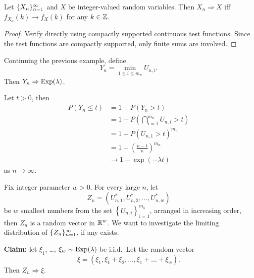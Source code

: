 \documentclass[a4paper]{article}
\newcommand{\convd}{\Rightarrow}
\begin{document}
\begin{prop}
  Let $\{ X_n \}_{n=1}^\infty$ and $X$ be integer-valued random variables.
  Then $X_n \convd X$ iff $f_{X_n} (k) \to f_X (k)$ for any $k \in \mathbb{Z}$.
\end{prop}

\begin{proof}
  Verify directly using compactly supported continuous test functions. 
  Since the test functions 
  are compactly supported, only finite sums are involved.

\end{proof}

\begin{eg}
  Continuing the previous example, define 
  \[
  Y_n = \min_{1 \leq i \leq m_n} U_{n, i}.
  \]
  Then $Y_n \convd \Exp (\lambda)$.

  Let $t > 0$, then 
  \begin{align*}
    P \left( Y_n \leq t \right)
    &= 1 - P \left( Y_n > t \right) \\
    &= 1 - P \left( \bigcap_{i=1}^{m_n} U_{n, i} > t \right) \\
    &= 1 - P \left( U_{n, 1} > t \right)^{m_n} \\
    &= 1 - \left( \frac{n - t}{n} \right)^{m_n}  \\
    &\to 1 - \exp (- \lambda t)
  \end{align*}
  as $n \to \infty$.

\end{eg}

\begin{eg}
  Fix integer parameter $w > 0$. For every large $n$, let 
  \[
  Z_n = (U_{n, 1}^*, U_{n, 2}^*, \dots, U_{n, w}^*)
  \]
  be $w$ smallest numbers from the set $\left\{ U_{n, i} \right\}_{i=1}^{m_n}$,
  arranged in increasing order, then $Z_n$ is a random 
  vector in $\mathbb{R}^w$. We want to investigate the limiting distribution 
  of $\{ Z_n \}_{n=1}^\infty$, if any exists.

  \textbf{Claim:} let $\xi_1$, \dots, $\xi_w \sim \operatorname{Exp} (\lambda)$ be i.i.d.\
  Let the random vector 
  \[
  \xi = (\xi_1, \xi_1 + \xi_2, \dots, \xi_1 + \dots + \xi_w).
  \]
  Then $Z_n \convd \xi$.

\end{eg}
\end{document}
